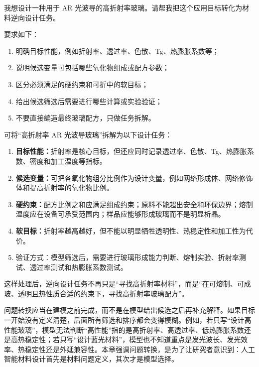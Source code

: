 \begin{samepage}
\begin{userbox}
我想设计一种用于 AR 光波导的高折射率玻璃。请帮我把这个应用目标转化为材料逆向设计任务。

要求如下：
\begin{enumerate}
\item 明确目标性能，例如折射率、透过率、色散、Tg、热膨胀系数等；
\item 说明候选变量可包括哪些氧化物组成或配方参数；
\item 区分必须满足的硬约束和可折中的软目标；
\item 给出候选筛选后需要进行哪些计算或实验验证；
\item 不要直接编造最终玻璃配方，只做任务拆解。
\end{enumerate}
\end{userbox}

\begin{aibox}
可将“高折射率 AR 光波导玻璃”拆解为以下设计任务：

\begin{enumerate}
\item \textbf{目标性能：}折射率是核心目标，但还应同时记录透过率、色散、Tg、热膨胀系数、密度和加工温度等指标。
\item \textbf{候选变量：}可把各氧化物组分比例作为设计变量，例如网络形成体、网络修饰体和提高折射率的氧化物比例。
\item \textbf{硬约束：}配方比例之和应满足组成约束；原料不能超出安全和环保边界；熔制温度应在设备可承受范围内；样品应能够形成玻璃而不是明显析晶。
\item \textbf{软目标：}折射率越高越好，但不能以明显牺牲透明性、热稳定性和加工性为代价。
\item 验证方式：模型筛选后，需要进行玻璃形成能力判断、熔制实验、折射率测试、透过率测试和热膨胀系数测试。
\end{enumerate}

这样处理后，逆向设计任务不再只是“寻找高折射率材料”，而是“在可熔制、可成玻、透明且热性质合适的约束下，寻找高折射率玻璃配方”。
\end{aibox}
\end{samepage}

问题转换应当在建模之前完成，而不是在模型给出候选之后再补充解释。如果目标一开始没有定义清楚，后面所有筛选和排序都会变得模糊。例如，若只写“设计高性能玻璃”，模型无法判断“高性能”指的是高折射率、高透过率、低热膨胀系数还是高热稳定性；若只写“设计蓝光材料”，模型也不知道重点是发光波长、发光效率、热稳定性还是外延兼容性。本章强调问题转换，是为了让研究者意识到：人工智能材料设计首先是材料问题定义，其次才是模型选择。

